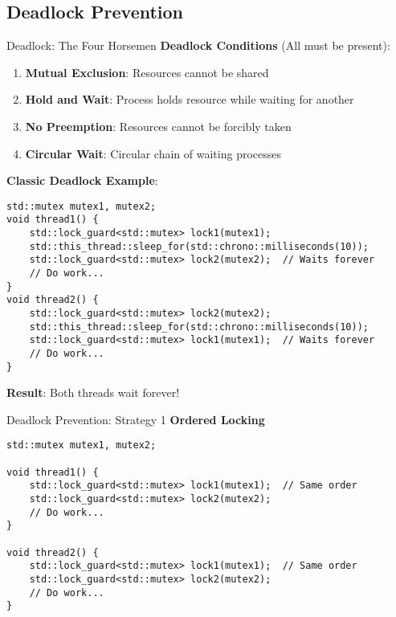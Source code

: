 \subsection{Deadlock Prevention}
\begin{frame}[fragile]{ Deadlock: The Four Horsemen}
	\textbf{Deadlock Conditions} (All must be present):
	\begin{enumerate}
		\item \textbf{Mutual Exclusion}: Resources cannot be shared
		\item \textbf{Hold and Wait}: Process holds resource while waiting for another
		\item \textbf{No Preemption}: Resources cannot be forcibly taken
		\item \textbf{Circular Wait}: Circular chain of waiting processes
	\end{enumerate}

	\vspace{1em}
	\textbf{Classic Deadlock Example}:
	\begin{verbatim}
std::mutex mutex1, mutex2;
void thread1() {
    std::lock_guard<std::mutex> lock1(mutex1);
    std::this_thread::sleep_for(std::chrono::milliseconds(10));
    std::lock_guard<std::mutex> lock2(mutex2);  // Waits forever
    // Do work...
}
void thread2() {
    std::lock_guard<std::mutex> lock2(mutex2);
    std::this_thread::sleep_for(std::chrono::milliseconds(10));
    std::lock_guard<std::mutex> lock1(mutex1);  // Waits forever
    // Do work...
}
	\end{verbatim}

	 \textbf{Result}: Both threads wait forever!
\end{frame}

\begin{frame}[fragile]{ Deadlock Prevention: Strategy 1}
	\textbf{Ordered Locking}

	\begin{verbatim}
std::mutex mutex1, mutex2;

void thread1() {
    std::lock_guard<std::mutex> lock1(mutex1);  // Same order
    std::lock_guard<std::mutex> lock2(mutex2);
    // Do work...
}

void thread2() {
    std::lock_guard<std::mutex> lock1(mutex1);  // Same order
    std::lock_guard<std::mutex> lock2(mutex2);
    // Do work...
}
	\end{verbatim}
\end{frame}

